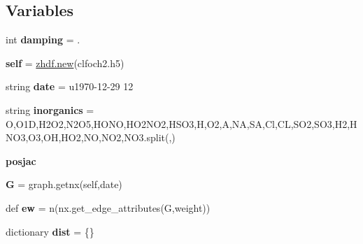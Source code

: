 \subsection*{Variables}
\begin{DoxyCompactItemize}
\item 
\mbox{\label{namespacedsmacc_1_1vis_1_1degree_a736314e2c72f5c809a076ad8fbe90d90}} 
int {\bfseries damping} = .
\item 
\mbox{\label{namespacedsmacc_1_1vis_1_1degree_a3deedd5031defbd8da91b22c529bba3a}} 
{\bfseries self} = \mbox{\hyperlink{classzhdf_1_1new}{zhdf.\+new}}(\textquotesingle{}clfoch2.\+h5\textquotesingle{})
\item 
\mbox{\label{namespacedsmacc_1_1vis_1_1degree_a81347507159b941c64e850ca1fcb9c18}} 
string {\bfseries date} = u\textquotesingle{}1970-\/12-\/29 12\textquotesingle{}
\item 
\mbox{\label{namespacedsmacc_1_1vis_1_1degree_aa188e436af37710213d9a6dc1b63dc8b}} 
string {\bfseries inorganics} = \textquotesingle{}O,O1D,H2\+O2,N2\+O5,H\+O\+NO,H\+O2\+N\+O2,H\+S\+O3,H,O2,A,NA,SA,Cl,CL,S\+O2,S\+O3,H2,H\+N\+O3,O3,OH,H\+O2,NO,N\+O2,N\+O3\textquotesingle{}.split(\textquotesingle{},\textquotesingle{})
\item 
\mbox{\label{namespacedsmacc_1_1vis_1_1degree_acae526f6e86d5531eca0388beed53ccf}} 
{\bfseries posjac}
\item 
\mbox{\label{namespacedsmacc_1_1vis_1_1degree_a1007bbfdeb8b3acc8754e0c61ef87727}} 
{\bfseries G} = graph.\+getnx(self,date)
\item 
\mbox{\label{namespacedsmacc_1_1vis_1_1degree_abe0062f5963af4d2c332282d78981b4c}} 
def {\bfseries ew} = n(nx.\+get\+\_\+edge\+\_\+attributes(G,\textquotesingle{}weight\textquotesingle{}))
\item 
\mbox{\label{namespacedsmacc_1_1vis_1_1degree_a5e142baa8d465ebc108d85e846e6e39b}} 
dictionary {\bfseries dist} = \{\}
\item 

\end{DoxyCompactItemize}

